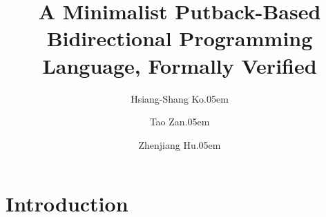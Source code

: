 \documentclass[fleqn]{llncs}
\begin{document}
\title{A Minimalist Putback-Based Bidirectional Programming Language, Formally Verified}
\author{Hsiang-Shang Ko\kern.05em \and Tao Zan\kern.05em \and Zhenjiang Hu\kern.05em}
\maketitle

\section{Introduction}
\label{sec:introduction}

\end{document}
